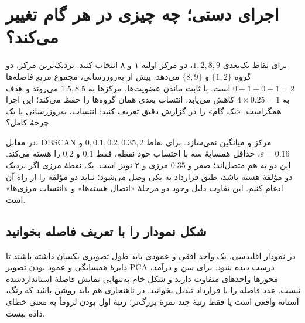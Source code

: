 \section{اجرای دستی؛ چه چیزی در هر گام تغییر می‌کند؟}
برای نقاط یک‌بعدی $1,2,8,9$، دو مرکز اولیهٔ ۱ و ۸ انتخاب کنید. نزدیک‌ترین مرکز، دو گروه $\{1,2\}$ و $\{8,9\}$ می‌دهد. پیش از به‌روزرسانی، مجموع مربع فاصله‌ها $0+1+0+1=2$ است. با ثابت ماندن عضویت‌ها، مرکزها به $1.5,8.5$ می‌روند و هدف به $4\times0.25=1$ کاهش می‌یابد. انتساب بعدی همان گروه‌ها را حفظ می‌کند؛ این اجرا همگراست. «یک گام» را در گزارش دقیق تعریف کنید: انتساب، به‌روزرسانی یا یک چرخهٔ کامل؟

در مقابل، DBSCAN مرکز و میانگین نمی‌سازد. برای نقاط $0,0.1,0.2,0.35,2$ و $\varepsilon=0.16$، حداقل همسایهٔ سه با احتساب خود نقطه، فقط $0.1$ و $0.2$ را هسته می‌کند. این دو به هم متصل‌اند؛ صفر و $0.35$ مرزی و ۲ نویز است. یک نقطهٔ مرزی اگر نزدیک دو مؤلفهٔ هسته باشد، طبق قرارداد به یکی وصل می‌شود؛ نباید دو مؤلفه را از راه آن ادغام کنیم. این تفاوت دلیل وجود دو مرحلهٔ «اتصال هسته‌ها» و «انتساب مرزی‌ها» است.

\subsection*{شکل نمودار را با تعریف فاصله بخوانید}
در نمودار اقلیدسی، یک واحد افقی و عمودی باید طول تصویری یکسان داشته باشند تا دایرهٔ همسایگی و عمود بودن تصویر PCA درست دیده شود. برای سن و درآمد، محورها واحدهای متفاوت دارند و شکل خام به‌تنهایی نمایش فاصلهٔ استانداردشده نیست. عدد فاصله را با قرارداد تبدیل بخوانید. در ناهنجاری هم باید روشن باشد که رنگ، آستانهٔ واقعی است یا فقط رتبهٔ چند نمرهٔ بزرگ‌تر؛ رتبهٔ اول بودن لزوماً به معنی خطای داده نیست.

